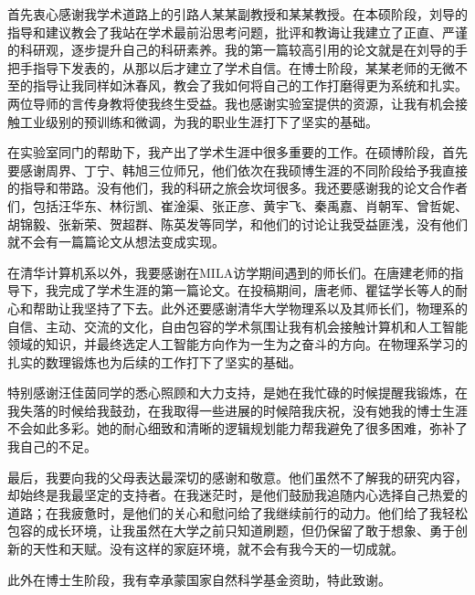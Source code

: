 
\begin{acknowledgements}
  首先衷心感谢我学术道路上的引路人某某副教授和某某教授。在本硕阶段，刘导的指导和建议教会了我站在学术最前沿思考问题，批评和教诲让我建立了正直、严谨的科研观，逐步提升自己的科研素养。我的第一篇较高引用的论文就是在刘导的手把手指导下发表的，从那以后才建立了学术自信。在博士阶段，某某老师的无微不至的指导让我同样如沐春风，教会了我如何将自己的工作打磨得更为系统和扎实。两位导师的言传身教将使我终生受益。我也感谢实验室提供的资源，让我有机会接触工业级别的预训练和微调，为我的职业生涯打下了坚实的基础。
  
  在实验室同门的帮助下，我产出了学术生涯中很多重要的工作。在硕博阶段，首先要感谢周界、丁宁、韩旭三位师兄，他们依次在我硕博生涯的不同阶段给予我直接的指导和带路。没有他们，我的科研之旅会坎坷很多。我还要感谢我的论文合作者们，包括汪华东、林衍凯、崔淦渠、张正彦、黄宇飞、秦禹嘉、肖朝军、曾哲妮、胡锦毅、张新荣、贺超群、陈英发等同学，和他们的讨论让我受益匪浅，没有他们就不会有一篇篇论文从想法变成实现。

  在清华计算机系以外，我要感谢在MILA访学期间遇到的师长们。在唐建老师的指导下，我完成了学术生涯的第一篇论文。在投稿期间，唐老师、瞿锰学长等人的耐心和帮助让我坚持了下去。此外还要感谢清华大学物理系以及其师长们，物理系的自信、主动、交流的文化，自由包容的学术氛围让我有机会接触计算机和人工智能领域的知识，并最终选定人工智能方向作为一生为之奋斗的方向。在物理系学习的扎实的数理锻炼也为后续的工作打下了坚实的基础。
  
  特别感谢汪佳茵同学的悉心照顾和大力支持，是她在我忙碌的时候提醒我锻炼，在我失落的时候给我鼓劲，在我取得一些进展的时候陪我庆祝，没有她我的博士生涯不会如此多彩。她的耐心细致和清晰的逻辑规划能力帮我避免了很多困难，弥补了我自己的不足。

  最后，我要向我的父母表达最深切的感谢和敬意。他们虽然不了解我的研究内容，却始终是我最坚定的支持者。在我迷茫时，是他们鼓励我追随内心选择自己热爱的道路；在我疲惫时，是他们的关心和慰问给了我继续前行的动力。他们给了我轻松包容的成长环境，让我虽然在大学之前只知道刷题，但仍保留了敢于想象、勇于创新的天性和天赋。没有这样的家庭环境，就不会有我今天的一切成就。

  此外在博士生阶段，我有幸承蒙国家自然科学基金资助，特此致谢。
\end{acknowledgements}
